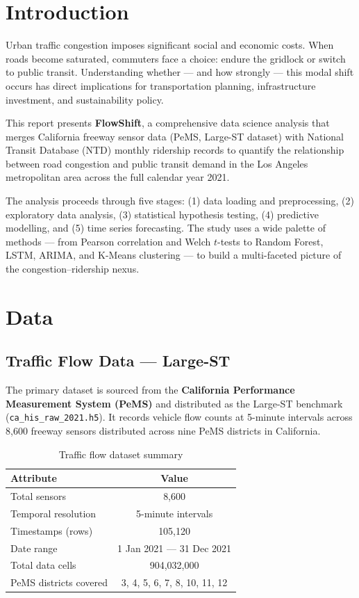 \documentclass[12pt,a4paper]{article}
\begin{document}
\section{Introduction}

Urban traffic congestion imposes significant social and economic costs. When roads become saturated, commuters face a choice: endure the gridlock or switch to public transit. Understanding whether — and how strongly — this modal shift occurs has direct implications for transportation planning, infrastructure investment, and sustainability policy.

This report presents \textbf{FlowShift}, a comprehensive data science analysis that merges California freeway sensor data (PeMS, Large-ST dataset) with National Transit Database (NTD) monthly ridership records to quantify the relationship between road congestion and public transit demand in the Los Angeles metropolitan area across the full calendar year 2021.

The analysis proceeds through five stages: (1) data loading and preprocessing, (2) exploratory data analysis, (3) statistical hypothesis testing, (4) predictive modelling, and (5) time series forecasting. The study uses a wide palette of methods — from Pearson correlation and Welch $t$-tests to Random Forest, LSTM, ARIMA, and K-Means clustering — to build a multi-faceted picture of the congestion–ridership nexus.

\section{Data}

\subsection{Traffic Flow Data — Large-ST}

The primary dataset is sourced from the \textbf{California Performance Measurement System (PeMS)} and distributed as the Large-ST benchmark (\texttt{ca\_his\_raw\_2021.h5}). It records vehicle flow counts at 5-minute intervals across 8,600 freeway sensors distributed across nine PeMS districts in California.

\begin{table}[H]
\centering
\caption{Traffic flow dataset summary}
\begin{tabular}{lc}
\toprule
\textbf{Attribute} & \textbf{Value} \\
\midrule
Total sensors             & 8,600 \\
Temporal resolution       & 5-minute intervals \\
Timestamps (rows)         & 105,120 \\
Date range                & 1 Jan 2021 — 31 Dec 2021 \\
Total data cells          & 904,032,000 \\
PeMS districts covered    & 3, 4, 5, 6, 7, 8, 10, 11, 12 \\
\bottomrule
\end{tabular}
\end{table}
\end{document}
